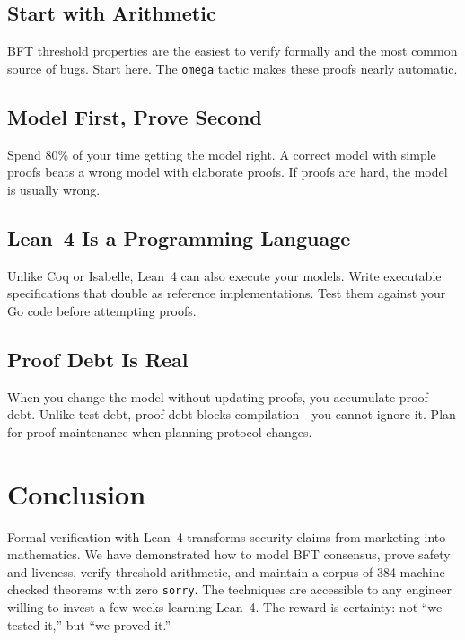 \documentclass[11pt,a4paper]{article}
\begin{document}
\subsection{Start with Arithmetic}

BFT threshold properties are the easiest to verify formally and the most common source
of bugs. Start here. The \texttt{omega} tactic makes these proofs nearly automatic.

\subsection{Model First, Prove Second}

Spend 80\% of your time getting the model right. A correct model with simple proofs
beats a wrong model with elaborate proofs. If proofs are hard, the model is usually
wrong.

\subsection{Lean~4 Is a Programming Language}

Unlike Coq or Isabelle, Lean~4 can also execute your models. Write executable
specifications that double as reference implementations. Test them against your Go code
before attempting proofs.

\subsection{Proof Debt Is Real}

When you change the model without updating proofs, you accumulate proof debt. Unlike
test debt, proof debt blocks compilation---you cannot ignore it. Plan for proof
maintenance when planning protocol changes.

\section{Conclusion}

Formal verification with Lean~4 transforms security claims from marketing into
mathematics. We have demonstrated how to model BFT consensus, prove safety and liveness,
verify threshold arithmetic, and maintain a corpus of 384 machine-checked theorems with
zero \texttt{sorry}. The techniques are accessible to any engineer willing to invest
a few weeks learning Lean~4. The reward is certainty: not ``we tested it,'' but ``we
proved it.''
\end{document}
